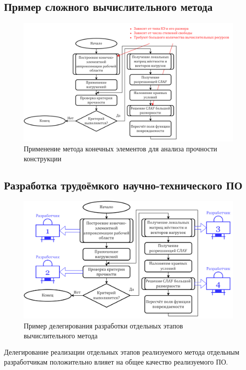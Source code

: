 ﻿%
\subsection{Пример сложного вычислительного метода}
\begin{frame}
  \begin{figure}
    \centering
    \includegraphics[width=\textwidth]{images/flowchart.fem.png}
    \caption{Применение метода конечных элементов для анализа прочности конструкции}
  \end{figure}

\end{frame}
\subsection{Разработка трудоёмкого научно-технического ПО}

\begin{frame}
  \begin{figure}
    \centering
    \includegraphics[width=\textwidth]{images/illustration.teamwork.png}
    \caption{Пример делегирования разработки отдельных этапов вычислительного метода}
  \end{figure}

  {\smaller[1]
  Делегирование реализации отдельных этапов реализуемого метода отдельным разработчикам положительно влияет на общее качество реализуемого ПО.
  }
\end{frame}

